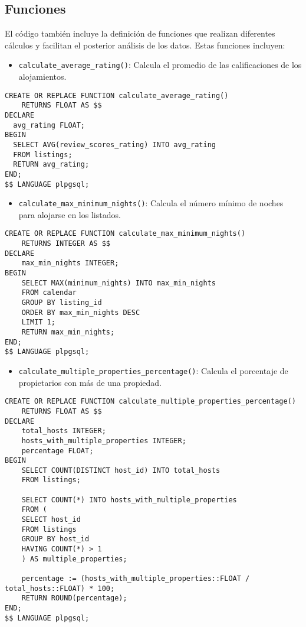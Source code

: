 \subsection{Funciones}

El código también incluye la definición de funciones que realizan diferentes cálculos y facilitan el posterior análisis de los datos. Estas funciones incluyen:

\begin{itemize}
    \item \texttt{calculate\_average\_rating()}: Calcula el promedio de las calificaciones de los alojamientos.
\end{itemize}
    \small 
    \begin{verbatim}
CREATE OR REPLACE FUNCTION calculate_average_rating() 
    RETURNS FLOAT AS $$
DECLARE
  avg_rating FLOAT;
BEGIN
  SELECT AVG(review_scores_rating) INTO avg_rating
  FROM listings;
  RETURN avg_rating;
END;
$$ LANGUAGE plpgsql;
    \end{verbatim}
\begin{itemize}
    \item \texttt{calculate\_max\_minimum\_nights()}: Calcula el número mínimo de noches para alojarse en los listados.
\end{itemize}
    \small 
    \begin{verbatim}
CREATE OR REPLACE FUNCTION calculate_max_minimum_nights()
    RETURNS INTEGER AS $$
DECLARE
    max_min_nights INTEGER;
BEGIN
    SELECT MAX(minimum_nights) INTO max_min_nights
    FROM calendar
    GROUP BY listing_id
    ORDER BY max_min_nights DESC
    LIMIT 1;
    RETURN max_min_nights;
END;
$$ LANGUAGE plpgsql;
    \end{verbatim}
\begin{itemize}
    \item \texttt{calculate\_multiple\_properties\_percentage()}: Calcula el porcentaje de propietarios con más de una propiedad.
\end{itemize}
    \small 
    \begin{verbatim}
CREATE OR REPLACE FUNCTION calculate_multiple_properties_percentage()
    RETURNS FLOAT AS $$
DECLARE
    total_hosts INTEGER;
    hosts_with_multiple_properties INTEGER;
    percentage FLOAT;
BEGIN
    SELECT COUNT(DISTINCT host_id) INTO total_hosts
    FROM listings;

    SELECT COUNT(*) INTO hosts_with_multiple_properties
    FROM (
    SELECT host_id
    FROM listings
    GROUP BY host_id
    HAVING COUNT(*) > 1
    ) AS multiple_properties;

    percentage := (hosts_with_multiple_properties::FLOAT / total_hosts::FLOAT) * 100;
    RETURN ROUND(percentage);
END;
$$ LANGUAGE plpgsql;
    \end{verbatim}

\newpage

